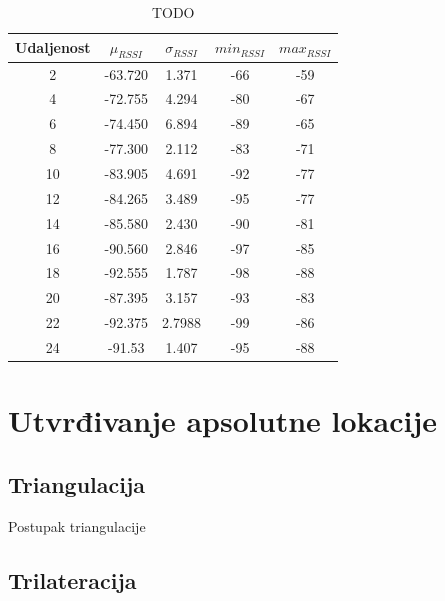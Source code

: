 


\begin{table}[H]
    \centering
    \caption{TODO}
    \label{tbl:velikaUdaljenost}
    \begin{tabular}{ccccc}
    \hline 
    Udaljenost & $\mu_{RSSI}$ & $\sigma_{RSSI}$ & $min_{RSSI}$ & $max_{RSSI}$ \\ 
    \hline 
    2 & -63.720 & 1.371 & -66 & -59 \\ 
    4 & -72.755 & 4.294 & -80 & -67 \\ 
    6 & -74.450 & 6.894 & -89 & -65 \\ 
    8 & -77.300 & 2.112 & -83 & -71 \\ 
    10 & -83.905 & 4.691 & -92 & -77 \\ 
    12 & -84.265 & 3.489 & -95 & -77 \\ 
    14 & -85.580 & 2.430 & -90 & -81 \\ 
    16 & -90.560 & 2.846 & -97 & -85 \\ 
    18 & -92.555 & 1.787 & -98 & -88 \\ 
    20 & -87.395 & 3.157 & -93 & -83 \\ 
    22 & -92.375 & 2.7988 & -99 & -86 \\ 
    24 & -91.53 & 1.407 & -95 & -88 \\ 
    \hline 
    \end{tabular} 
\end{table}





\section{Utvrđivanje apsolutne lokacije}

\subsection{Triangulacija}

Postupak triangulacije

\subsection{Trilateracija}
